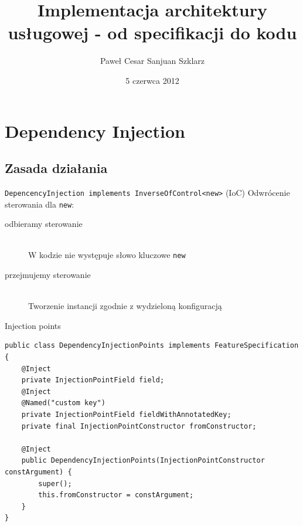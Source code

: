 \documentclass[smaller]{beamer}
\title[Implementacja architektury usługowej]{Implementacja architektury usługowej - od specifikacji do kodu}
\author{Paweł Cesar Sanjuan Szklarz}
\institute{}
\date{5 czerwca 2012}
\begin{document}
\begin{frame}
\titlepage
\end{frame}


\begin{frame}
 \tableofcontents
\end{frame}

\section{Dependency Injection}
\subsection{Zasada działania}

\begin{frame}{\lstinline|DepencencyInjection implements InverseOfControl<new>|}
(IoC) Odwrócenie sterowania dla \lstinline|new|:
\begin{description}
 \item[odbieramy sterowanie] \hfill \\
 W kodzie nie występuje słowo kluczowe \lstinline|new|
 \item[przejmujemy sterowanie] \hfill \\
 Tworzenie instancji zgodnie z wydzieloną konfiguracją 
\end{description}
\end{frame}

\begin{frame}[fragile]{Injection points}
\begin{lstlisting}
public class DependencyInjectionPoints implements FeatureSpecification {
	@Inject
	private InjectionPointField field;
	@Inject
	@Named("custom key")
	private InjectionPointField fieldWithAnnotatedKey;
	private final InjectionPointConstructor fromConstructor;

	@Inject
	public DependencyInjectionPoints(InjectionPointConstructor constArgument) {
		super();
		this.fromConstructor = constArgument;
	}
}

\end{lstlisting}
% 
\end{frame}
\end{document}
